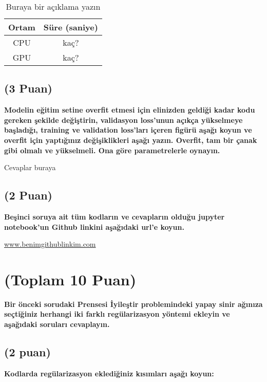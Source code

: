 \documentclass[11pt]{article}
\begin{document}
\begin{itemize}
\begin{itemize}
\begin{table}[ht!]
    \centering
    \caption{Buraya bir açıklama yazın}
    \begin{tabular}{c|c}
        Ortam & Süre (saniye) \\\hline
        CPU & kaç? \\
        GPU & kaç?\\
    \end{tabular}
    \label{tab:my_table}
\end{table}

\subsection{(3 Puan)} \textbf{Modelin eğitim setine overfit etmesi için elinizden geldiği kadar kodu gereken şekilde değiştirin, validasyon loss'unun açıkça yükselmeye başladığı, training ve validation loss'ları içeren figürü aşağı koyun ve overfit için yaptığınız değişiklikleri aşağı yazın. Overfit, tam bir çanak gibi olmalı ve yükselmeli. Ona göre parametrelerle oynayın.}

Cevaplar buraya

\begin{comment}
\begin{figure}[ht!]
    \centering
    \texttt{[image: mypicturehere.png]}
    \caption{Buraya açıklama yazın}
    \label{fig:my_pic}
\end{figure}
\end{comment}

\subsection{(2 Puan)} \textbf{Beşinci soruya ait tüm kodların ve cevapların olduğu jupyter notebook'un Github linkini aşağıdaki url'e koyun.}

\url{www.benimgithublinkim.com}

\section{(Toplam 10 Puan)} \textbf{Bir önceki sorudaki Prensesi İyileştir problemindeki yapay sinir ağınıza seçtiğiniz herhangi iki farklı regülarizasyon yöntemi ekleyin ve aşağıdaki soruları cevaplayın.} 

\subsection{(2 puan)} \textbf{Kodlarda regülarizasyon eklediğiniz kısımları aşağı koyun:} 


\end{itemize}
\end{itemize}
\end{document}
